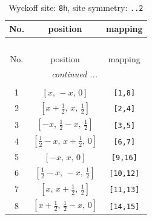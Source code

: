 \documentclass[fleqn,8pt]{jsarticle}
\begin{document}
\begin{longtable}{ccc}
\caption{Wyckoff site: {\tt 8h}, site symmetry: {\tt ..2}}
 \\
 \hline \hline
No. & position & mapping \\ \hline \endfirsthead

\multicolumn{2}{l}{\tablename\ \thetable{}} \\
 \hline \hline
No. & position & mapping \\ \hline \endhead

 \hline \hline
\multicolumn{2}{r}{\footnotesize\it continued ...} \\ \endfoot

 \hline \hline
\multicolumn{2}{r}{} \\ \endlastfoot

1 & $\left[ x,\, - x,\, 0 \right]$ & {\tt [1,8]} \\ \hline
2 & $\left[ x + \frac{1}{2},\, x,\, \frac{1}{2} \right]$ & {\tt [2,4]} \\ \hline
3 & $\left[ - x,\, \frac{1}{2} - x,\, \frac{1}{2} \right]$ & {\tt [3,5]} \\ \hline
4 & $\left[ \frac{1}{2} - x,\, x + \frac{1}{2},\, 0 \right]$ & {\tt [6,7]} \\ \hline
5 & $\left[ - x,\, x,\, 0 \right]$ & {\tt [9,16]} \\ \hline
6 & $\left[ \frac{1}{2} - x,\, - x,\, \frac{1}{2} \right]$ & {\tt [10,12]} \\ \hline
7 & $\left[ x,\, x + \frac{1}{2},\, \frac{1}{2} \right]$ & {\tt [11,13]} \\ \hline
8 & $\left[ x + \frac{1}{2},\, \frac{1}{2} - x,\, 0 \right]$ & {\tt [14,15]} \\
\end{longtable}
\renewcommand{\arraystretch}{1.2}
\end{document}
